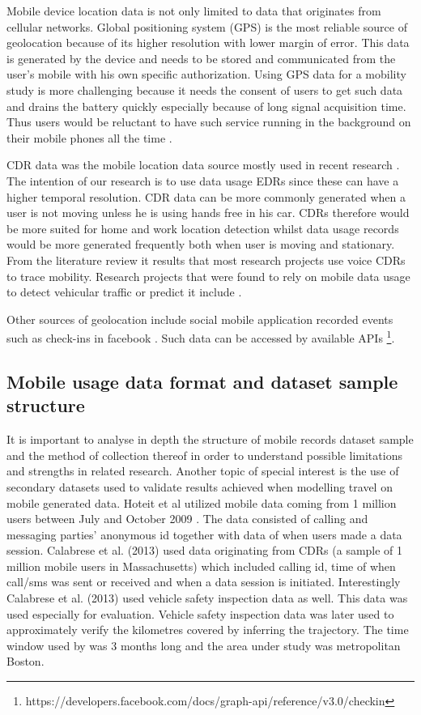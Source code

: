 \documentclass[12pt, a4paper]{report}
\theoremstyle{definition}
\theoremstyle{definition}%
\theoremstyle{definition}%
\theoremstyle{definition}%
\theoremstyle{definition}%
\theoremstyle{definition}%
\begin{document}
Mobile device location data is not only limited to data that originates from cellular networks. Global positioning system (GPS) is the most reliable source of geolocation because of its higher resolution with lower margin of error. This data is generated by the device and needs to be stored and communicated from the user's mobile with his own specific authorization. Using GPS data for a mobility study is more challenging because it needs the consent of users to get such data and drains the battery quickly especially because of long signal acquisition time\cite{Wang2012}. Thus users would be reluctant to have such service running in the background on their mobile phones all the time \cite{Ahas2011}. 

CDR data was the mobile location data source mostly used in recent research \cite{Hoteit2016}. The intention of our research is to use data usage EDRs since these can have a higher temporal resolution. CDR data can be more commonly generated when a user is not moving unless he is using hands free in his car. CDRs therefore would be more suited for home and work location detection whilst data usage records would be more generated frequently both when user is moving and stationary. From the literature review it results that most research projects use voice CDRs to trace mobility. Research projects that were found to rely on mobile data usage to detect vehicular traffic or predict it include \cite{Hoteit2014,Calabrese2011}.

Other sources of geolocation include social mobile application recorded events such as check-ins in facebook \cite{Hoteit2014}. Such data can be accessed by available APIs \footnote{https://developers.facebook.com/docs/graph-api/reference/v3.0/checkin}.

\subsection{Mobile usage data format and dataset sample structure} \label{methodoloy_sources}


It is important to analyse in depth the structure of mobile records dataset sample and the method of collection thereof in order to understand possible limitations and strengths in related research. Another topic of special interest is the use of secondary datasets used to validate results achieved when modelling travel on mobile generated data. Hoteit et al utilized mobile data coming from 1 million users between July and October 2009 \cite{Hoteit2014}. The data consisted of calling and messaging parties' anonymous id together with data of when users made a data session. Calabrese et al. (2013) used data originating from CDRs (a sample of 1 million mobile users in Massachusetts) which included calling id, time of when call/sms was sent or received and when a data session is initiated. Interestingly Calabrese et al. (2013) used vehicle safety inspection data as well. This data was used especially for evaluation. Vehicle safety inspection data was later used to approximately verify the kilometres covered by inferring the trajectory. The time window used by \cite{Calabrese2013} was 3 months long and the  area under study was metropolitan Boston.
\end{document}

